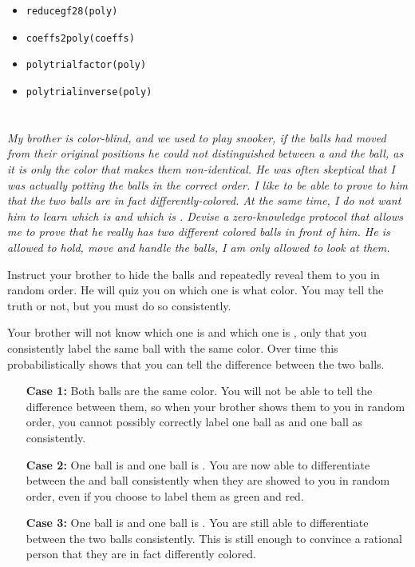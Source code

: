 \documentclass[12pt]{article}
\begin{document}
    \begin{itemize}
        \item \texttt{reduce\textunderscore{}gf28(poly)}
        \item \texttt{coeffs2poly(coeffs)}
        \item \texttt{poly\textunderscore{}trial\textunderscore{}factor(poly)}
        \item \texttt{poly\textunderscore{}trial\textunderscore{}inverse(poly)}
    \end{itemize}

\section{} \textit{My brother is color-blind, and we used to play snooker, if the balls had moved from their original positions he could not distinguished between a \red{} and the \green{} ball, as it is only the color that makes them non-identical. He was often skeptical that I was actually potting the balls in the correct order. I like to be able to prove to him that the two balls are in fact differently-colored. At the same time, I do not want him to learn which is \red{} and which is \green{}. Devise a zero-knowledge protocol that allows me to prove that he really has two different colored balls in front of him. He is allowed to hold, move and handle the balls, I am only allowed to look at them.}

    Instruct your brother to hide the balls and repeatedly reveal them to you in random order. He will quiz you on which one is what color. You may tell the truth or not, but you must do so consistently.

    Your brother will not know which one is \green{} and which one is \red{}, only that you consistently label the same ball with the same color. Over time this probabilistically shows that you can tell the difference between the two balls.

    \begin{enumerate}
        \item[\textbf{Case 1:}] Both balls are the same color. You will not be able to tell the difference between them, so when your brother shows them to you in random order, you cannot possibly correctly label one ball as \red{} and one ball as \green{} consistently.

        \item[\textbf{Case 2:}] One ball is \red{} and one ball is \green{}. You are now able to differentiate between the \red{} and \green{} ball consistently when they are showed to you in random order, even if you choose to label them as {\color{red}green} and {\color{green}red}.

        \item[\textbf{Case 3:}] One ball is \purple{} and one ball is \orange{}. You are still able to differentiate between the two balls consistently. This is still enough to convince a rational person that they are in fact differently colored.
    \end{enumerate}
\end{document}
